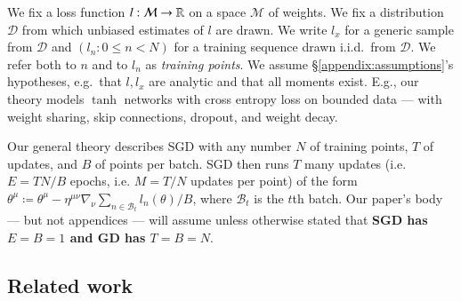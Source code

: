 \documentclass{article}
\theoremstyle{plain}
\theoremstyle{definition}
\newcommand{\Bb}{\mathcal{B}}
\newcommand{\Dd}{\mathcal{D}}
\newcommand{\Mm}{\mathcal{M}}
\begin{document}
        We fix a loss function $l:\Mm\to\RR$ on a space $\Mm$ of weights.  We
        fix a distribution $\Dd$ from which unbiased estimates of $l$ are
        drawn.  We write $l_x$ for a generic sample from $\Dd$ and $(l_n: 0\leq
        n<N)$ for a training sequence drawn i.i.d.\ from $\Dd$.  We refer both
        to $n$ and to $l_n$ as \emph{training points}.  We assume
        \S\ref{appendix:assumptions}'s hypotheses, e.g.\ that $l, l_x$ are
        analytic and that all moments exist.
        E.g., our theory models $\tanh$ networks with cross entropy loss on
        bounded data --- with weight sharing, skip connections, dropout, and
        weight decay.
        

        Our general theory describes SGD with any number
             $N$ of training points,
             $T$ of updates, and 
             $B$ of points per batch.
        SGD then runs $T$ many updates (i.e. $E=TN/B$ epochs, i.e. $M=T/N$
        updates per point) of the form
        $
            \theta^\mu
            \coloneqq
            \theta^\mu -
            \eta^{\mu\nu} \nabla_\nu
                \sum_{n\in \Bb_t} l_n(\theta) / B
        $,
        where $\Bb_t$ is the $t$th batch.  Our paper's body --- but not
        appendices --- will assume unless otherwise stated that \textbf{SGD has
        $E=B=1$ and GD has $T=B=N$}.


\subsection{Related work} \label{sect:related}

\end{document}
